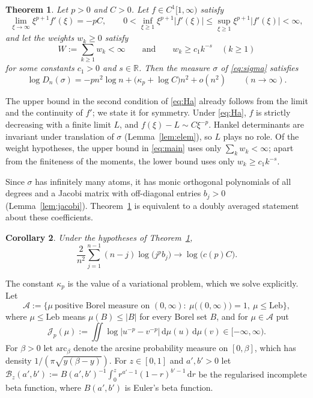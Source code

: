 \documentclass{amsart}
\newtheorem{theorem}{Theorem}[section]
\newtheorem{corollary}[theorem]{Corollary}
\theoremstyle{definition}
\theoremstyle{remark}
\numberwithin{equation}{section}
\newcommand{\R}{\mathbb{R}}
\newcommand{\cA}{\mathcal{A}}
\newcommand{\cJ}{\mathcal{J}}
\newcommand{\cB}{\mathcal{B}}
\newcommand{\dd}{\,\mathrm{d}}
\newcommand{\Leb}{\mathrm{Leb}}
\newcommand{\arc}{\mathrm{arc}}
\begin{document}
\begin{theorem}\label{thm:main}
Let $p>0$ and $C>0$. Let $f\in C^1[1,\infty)$ satisfy
\begin{equation}\label{eq:Ha}
  \lim_{\xi\to\infty}\xi^{p+1}f'(\xi)=-pC,\qquad
  0<\inf_{\xi\ge1}\xi^{p+1}|f'(\xi)|\le\sup_{\xi\ge1}\xi^{p+1}|f'(\xi)|<\infty,
\end{equation}
and let the weights $w_k\ge0$ satisfy
\begin{equation}\label{eq:Hw}
  W:=\sum_{k\ge1}w_k<\infty\qquad\text{and}\qquad w_k\ge c_1k^{-s}\quad(k\ge1)
\end{equation}
for some constants $c_1>0$ and $s\in\R$. Then the measure $\sigma$ of \eqref{eq:sigma} satisfies
\begin{equation}\label{eq:main}
  \log D_n(\sigma)=-pn^2\log n+\bigl(\kappa_p+\log C\bigr)n^2+o(n^2)\qquad(n\to\infty).
\end{equation}
\end{theorem}

The upper bound in the second condition of \eqref{eq:Ha} already follows from the limit and the
continuity of $f'$; we state it for symmetry. Under \eqref{eq:Ha}, $f$ is strictly decreasing with a finite limit $L$,
and $f(\xi)-L\sim C\xi^{-p}$. Hankel determinants are invariant under translation of $\sigma$ (Lemma~\ref{lem:elem}),
so $L$ plays no role. Of the weight hypotheses, the upper bound in \eqref{eq:main} uses only $\sum_kw_k<\infty$; apart
from the finiteness of the moments, the lower bound uses only $w_k\ge c_1k^{-s}$.

Since $\sigma$ has infinitely many atoms, it has monic orthogonal polynomials of all degrees and a Jacobi matrix with
off-diagonal entries $b_j>0$ (Lemma~\ref{lem:jacobi}). Theorem~\ref{thm:main} is equivalent to a doubly averaged
statement about these coefficients.

\begin{corollary}\label{cor:jacobi}
Under the hypotheses of Theorem~\ref{thm:main},
\[
  \frac{2}{n^2}\sum_{j=1}^{n-1}(n-j)\log\bigl(j^pb_j\bigr)\longrightarrow\log\bigl(c(p)C\bigr).
\]
\end{corollary}

The constant $\kappa_p$ is the value of a variational problem, which we solve explicitly. Let
\[
  \cA:=\bigl\{\mu\ \text{positive Borel measure on }(0,\infty):\ \mu\bigl((0,\infty)\bigr)=1,\ \mu\le\Leb\bigr\},
\]
where $\mu\le\Leb$ means $\mu(B)\le|B|$ for every Borel set $B$, and for $\mu\in\cA$ put
\begin{equation}\label{eq:J}
  \cJ_p(\mu):=\iint\log\bigl|u^{-p}-v^{-p}\bigr|\dd\mu(u)\dd\mu(v)\in[-\infty,\infty).
\end{equation}
For $\beta>0$ let $\arc_\beta$ denote the arcsine probability measure on $[0,\beta]$, which has density
$1/(\pi\sqrt{y(\beta-y)})$. For $z\in[0,1]$ and $a',b'>0$ let
$\cB_z(a',b'):=B(a',b')^{-1}\int_0^zr^{a'-1}(1-r)^{b'-1}\dd r$ be the regularised incomplete beta
function, where $B(a',b')$ is Euler's beta function.
\end{document}
